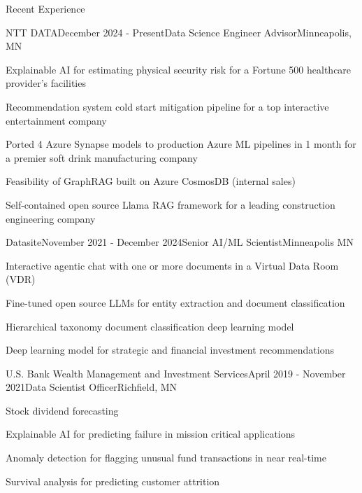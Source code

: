 \documentclass[
	11pt, %
]{resume} %
\begin{document}

\begin{rSection}{Recent Experience}
	\begin{rSubsection}{NTT DATA}{December 2024 - Present}{Data Science Engineer Advisor}{Minneapolis, MN}
		\item Explainable AI for estimating physical security risk for a Fortune 500 healthcare provider's facilities
		\item Recommendation system cold start mitigation pipeline for a top interactive entertainment company
		\item Ported 4 Azure Synapse models to production Azure ML pipelines in 1 month for a premier soft drink manufacturing company
		\item Feasibility of GraphRAG built on Azure CosmosDB (internal sales)
		\item Self-contained open source Llama RAG framework for a leading construction engineering company
	\end{rSubsection}
	
	\begin{rSubsection}{Datasite}{November 2021 - December 2024}{Senior AI/ML Scientist}{Minneapolis MN}
		\item Interactive agentic chat with one or more documents in a Virtual Data Room (VDR)
		\item Fine-tuned open source LLMs for entity extraction and document classification
		\item Hierarchical taxonomy document classification deep learning model
		\item Deep learning model for strategic and financial investment recommendations
	\end{rSubsection}

	\begin{rSubsection}{U.S. Bank Wealth Management and Investment Services}{April 2019 - November 2021}{Data Scientist Officer}{Richfield, MN}
		\item Stock dividend forecasting
		\item Explainable AI for predicting failure in mission critical applications
		\item Anomaly detection for flagging unusual fund transactions in near real-time
		\item Survival analysis for predicting customer attrition
	\end{rSubsection}
	

\end{rSection}
\end{document}
